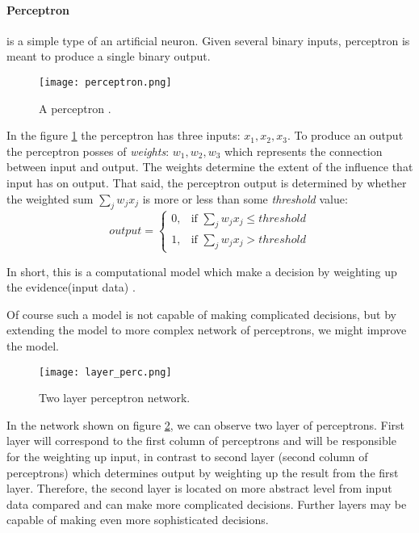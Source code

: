 \paragraph{Perceptron} is a simple type of an artificial neuron.
Given several binary inputs, perceptron is meant to produce a single binary output.
\begin{figure}[H]
	\texttt{[image: perceptron.png]}
	\caption{A perceptron \cite{Nielsen2015}.} %
	\label{img:model} %
\end{figure}
In the figure \ref{img:model} the perceptron has three inputs: $x_1, x_2, x_3$.
To produce an output the perceptron posses of \emph{weights}: $w_1, w_2, w_3$ which represents
the connection between input and output. The weights determine the
extent of the influence that input has on output.
That said, the perceptron output is determined by whether the weighted sum $\sum_j w_j x_j$ is more or less
than some \emph{threshold} value:
\begin{equation} \label{perc:out}
	output = \begin{cases} 0, & \mbox{if } \sum_j w_j x_j \leq threshold \\ 1, & \mbox{if } \sum_j w_j x_j > threshold \end{cases}
\end{equation}

In short, this is a computational model which make a decision by weighting up
the evidence(input data) \cite{rosenblatt1962principles}.

Of course such a model is not capable of making complicated decisions, but
by extending the model to more complex network of perceptrons, we might improve the model.

\begin{figure}[H]
	\texttt{[image: layer\_perc.png]}
	\caption{Two layer perceptron network\cite{Nielsen2015}.} %
	\label{img:layer_perc} %
\end{figure}

In the network shown on figure \ref{img:layer_perc}, we can observe
two layer of perceptrons. First layer will correspond to the first column of perceptrons
and will be responsible for the weighting up input, in contrast to second layer
(second column of perceptrons) which determines output by weighting up the result from
the first layer. Therefore, the second layer is located on more abstract level from input data
compared and can make more complicated decisions. Further layers may be capable
of making even more sophisticated decisions.
